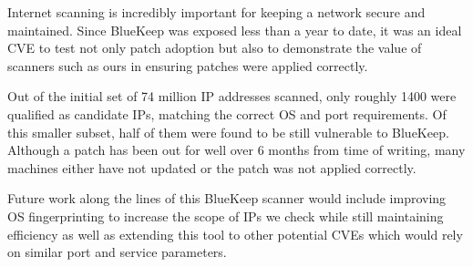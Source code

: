 Internet scanning is incredibly important for keeping a network secure and maintained. Since BlueKeep was exposed less than a year to date, it was an ideal CVE to test not only patch adoption but also to demonstrate the value of scanners such as ours in ensuring patches were applied correctly.

Out of the initial set of 74 million IP addresses scanned, only roughly 1400 were qualified as candidate IPs, matching the correct OS and port requirements. Of this smaller subset, half of them were found to be still vulnerable to BlueKeep. Although a patch has been out for well over 6 months from time of writing, many machines either have not updated or the patch was not applied correctly.

Future work along the lines of this BlueKeep scanner would include improving OS fingerprinting to increase the scope of IPs we check while still maintaining efficiency as well as extending this tool to other potential CVEs which would rely on similar port and service parameters.